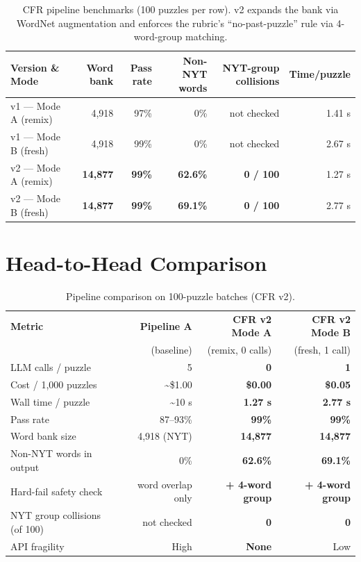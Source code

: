 \documentclass[11pt, letterpaper]{article}
\begin{document}
\begin{table}[H]
\centering
\small
\begin{tabular}{lrrrrr}
\toprule
\textbf{Version \& Mode} & \textbf{Word bank} & \textbf{Pass rate} & \textbf{Non-NYT words} & \textbf{NYT-group collisions} & \textbf{Time/puzzle} \\
\midrule
v1 --- Mode A (remix) & 4{,}918 & 97\% & 0\% & not checked & 1.41 s \\
v1 --- Mode B (fresh) & 4{,}918 & 99\% & 0\% & not checked & 2.67 s \\
v2 --- Mode A (remix) & \textbf{14{,}877} & \textbf{99\%} & \textbf{62.6\%} & \textbf{0 / 100} & 1.27 s \\
v2 --- Mode B (fresh) & \textbf{14{,}877} & \textbf{99\%} & \textbf{69.1\%} & \textbf{0 / 100} & 2.77 s \\
\bottomrule
\end{tabular}
\caption{CFR pipeline benchmarks (100 puzzles per row). v2 expands the bank via WordNet
augmentation and enforces the rubric's ``no-past-puzzle'' rule via 4-word-group
matching.}
\end{table}

\section{Head-to-Head Comparison}

\begin{table}[H]
\centering
\small
\begin{tabular}{l r r r}
\toprule
\textbf{Metric} & \textbf{Pipeline A} & \textbf{CFR v2 Mode A} & \textbf{CFR v2 Mode B} \\
                & (baseline)          & (remix, 0 calls)        & (fresh, 1 call) \\
\midrule
LLM calls / puzzle              & 5                & \textbf{0}             & \textbf{1} \\
Cost / 1{,}000 puzzles          & \textasciitilde\$1.00 & \textbf{\$0.00}   & \textbf{\$0.05} \\
Wall time / puzzle              & \textasciitilde10 s    & \textbf{1.27 s}    & \textbf{2.77 s} \\
Pass rate                       & 87--93\%         & \textbf{99\%}          & \textbf{99\%} \\
Word bank size                  & 4{,}918 (NYT)    & \textbf{14{,}877}      & \textbf{14{,}877} \\
Non-NYT words in output         & 0\%              & \textbf{62.6\%}        & \textbf{69.1\%} \\
Hard-fail safety check          & word overlap only & \textbf{+ 4-word group}& \textbf{+ 4-word group} \\
NYT group collisions (of 100)   & not checked      & \textbf{0}              & \textbf{0} \\
API fragility                   & High             & \textbf{None}           & Low \\
\bottomrule
\end{tabular}
\caption{Pipeline comparison on 100-puzzle batches (CFR v2).}
\end{table}
\end{document}
